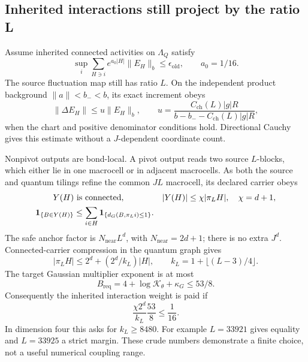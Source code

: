 \subsection{Inherited interactions still project by the ratio L}

Assume inherited connected activities on $\Lambda_Q$ satisfy
\begin{equation}\label{ag-inherited-input}
 \sup_i\sum_{H\ni i}e^{a_0|H|}\|E_H\|_b
       \le\epsilon_{\mathrm{old}},\qquad a_0=1/16.
\end{equation}
The source fluctuation map still has ratio $L$. On the
independent product background $\|a\|<b_-<b$, its exact
increment obeys
\begin{equation}\label{ag-inherited-increment}
 \|\Delta E_H\|\le u\|E_H\|_b,\qquad
 u=\frac{C_{\mathrm{ch}}(L)|g|R}
        {b-b_- - C_{\mathrm{ch}}(L)|g|R},
\end{equation}
when the chart and positive denominator conditions hold.
Directional Cauchy gives this estimate without a
$J$-dependent coordinate count.

Nonpivot outputs are bond-local. A pivot output reads two
source $L$-blocks, which either lie in one macrocell or in
adjacent macrocells. As both the source and quantum tilings
refine the common $JL$ macrocell, its declared carrier obeys
\begin{align}
 Y(H)&\text{ is connected},&
 |Y(H)|&\le\chi|\pi_LH|,\quad\chi=d+1,\notag\\
 \mathbf1_{\{B\in Y(H)\}}
 &\le\sum_{i\in H}\mathbf1_{\{d_G(B,\pi_Li)\le1\}}.
                                                               \label{ag-pivot-geometry}
\end{align}
The safe anchor factor is $N_{\mathrm{near}}L^d$, with
$N_{\mathrm{near}}=2d+1$; there is no extra $J^d$.
Connected-carrier compression in the quantum graph gives
\begin{equation}\label{ag-quantum-compression}
 |\pi_LH|\le2^d+(2^d/k_L)|H|,\qquad
 k_L=1+\lfloor(L-3)/4\rfloor.
\end{equation}
The target Gaussian multiplier exponent is at most
\begin{equation}\label{ag-required-weight}
 B_{\mathrm{req}}=4+\log\mathcal K_\theta+\kappa_G
                  \le53/8.
\end{equation}
Consequently the inherited interaction weight is paid if
\begin{equation}\label{ag-L-choice}
 \frac{\chi2^d}{k_L}\frac{53}{8}\le\frac1{16}.
\end{equation}
In dimension four this asks for $k_L\ge8480$. For example
$L=33921$ gives equality and $L=33925$ a strict margin.
These crude numbers demonstrate a finite choice, not a
useful numerical coupling range.

